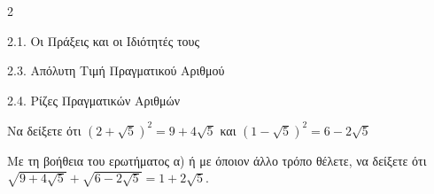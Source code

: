 \begin{ylh}{2}
    \item 2.1. Οι Πράξεις και οι Ιδιότητές τους
    \item 2.3. Απόλυτη Τιμή Πραγματικού Αριθμού
    \item 2.4. Ρίζες Πραγματικών Αριθμών
\end{ylh}

\begin{alist}
\item Να δείξετε ότι $\left( 2 + \sqrt{5} \right)^{2} = 9 + 4\sqrt{5}$ και $\left( 1 - \sqrt{5} \right)^{2} = 6 - 2\sqrt{5}$
\item Με τη βοήθεια του ερωτήματος α) ή με όποιον άλλο τρόπο θέλετε, να δείξετε ότι $\sqrt{9 + 4\sqrt{5}} + \sqrt{6 - 2\sqrt{5}} = 1 + 2\sqrt{5}$.
\end{alist}

